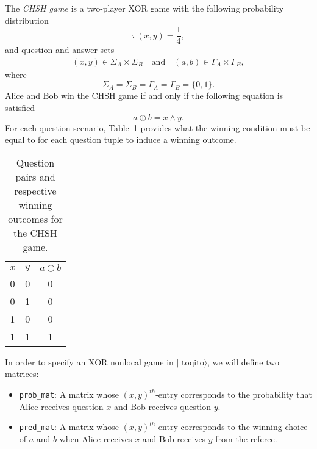 \documentclass[nofootinbib,superscriptaddress,a4paper,twocolumn,longbibliography,floatfix,pra]{revtex4-2}
\newcommand{\toqitofont}{%
	\fontfamily{FiraSans}%
	\selectfont}
\newcommand{\toqito}{ $|${\toqitofont toqito}$\rangle$\xspace}
\begin{document}
The \emph{CHSH game} is a two-player XOR game with the following probability
distribution 
\begin{equation}
    \pi(x,y) = \frac{1}{4},
\end{equation}
and question and answer sets
\begin{equation}
    \begin{aligned}
        (x,y) \in \Sigma_A \times \Sigma_B \quad \text{and} \quad (a,b) \in
        \Gamma_A \times \Gamma_B,
    \end{aligned}
\end{equation}
where 
\begin{equation}
    \Sigma_A = \Sigma_B = \Gamma_A = \Gamma_B = \{0,1\}.
\end{equation}
Alice and Bob win the CHSH game if and only if the following equation is
satisfied
\begin{equation}
    a \oplus b = x \land y.
\end{equation}
For each question scenario, Table~\ref{tab:chsh_winning} provides what the
winning condition must be equal to for each question tuple to induce a winning
outcome.
\begin{table}[!htpb]\label{tab:chsh_winning}
    \begin{tabular}{|c|c|c|}
        \hline
        \textbf{$x$} & \textbf{$y$} & \textbf{$a \oplus b$} \\ \hline
        0 & 0 & 0 \\ \hline
        0 & 1 & 0 \\ \hline
        1 & 0 & 0 \\ \hline
        1 & 1 & 1 \\ \hline
    \end{tabular}
    \caption{Question pairs and respective winning outcomes for the CHSH game.}
\end{table}
In order to specify an XOR nonlocal game in \toqito, we will define two
matrices:

\begin{itemize}[noitemsep]
    \item \texttt{prob\_mat}: A matrix whose $(x,y)^{th}$-entry corresponds to
        the probability that Alice receives question $x$ and Bob receives
        question $y$. \\
    \item \texttt{pred\_mat}: A matrix whose $(x,y)^{th}$-entry corresponds to
        the winning choice of $a$ and $b$ when Alice receives $x$ and Bob
        receives $y$ from the referee.
\end{itemize}
\end{document}
